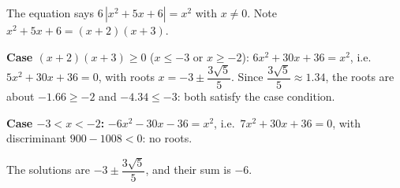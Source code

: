 The equation says $6\,|x^2+5x+6|=x^2$ with $x\ne0$. Note $x^2+5x+6=(x+2)(x+3)$.

\textbf{Case $(x+2)(x+3)\ge0$} ($x\le-3$ or $x\ge-2$): $6x^2+30x+36=x^2$, i.e.\ $5x^2+30x+36=0$, with roots $x=-3\pm\dfrac{3\sqrt5}{5}$. Since $\dfrac{3\sqrt5}{5}\approx1.34$, the roots are about $-1.66\ge-2$ and $-4.34\le-3$: both satisfy the case condition.

\textbf{Case $-3<x<-2$:} $-6x^2-30x-36=x^2$, i.e.\ $7x^2+30x+36=0$, with discriminant $900-1008<0$: no roots.

The solutions are $-3\pm\dfrac{3\sqrt5}{5}$, and their sum is $\boxed{-6}$.
